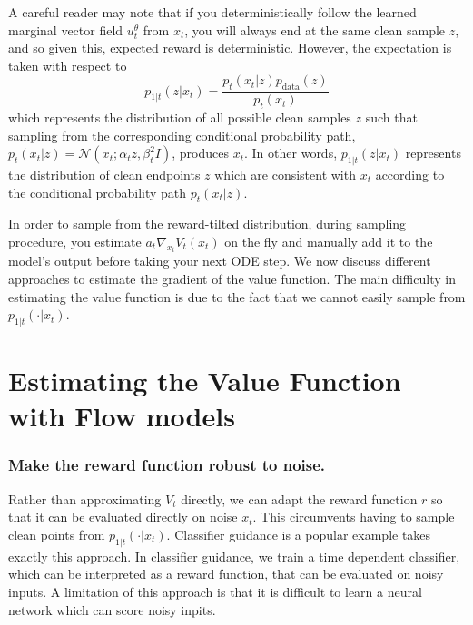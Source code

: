 \documentclass[12pt,a4paper]{report}
\begin{document}
A careful reader may note that if you deterministically follow the learned marginal vector field $u_t^\theta$ from $x_t$, you will always end at the same clean sample $z$, and so given this, expected reward is deterministic. However, the expectation is taken with respect to
$$
p_{1|t}(z|x_t) = \frac{p_t(x_t|z)p_{\text{data}}(z)}{p_t(x_t)}
$$
which represents the distribution of all possible clean samples $z$ such that sampling from the corresponding conditional probability path, $p_t(x_t|z)=\mathcal{N}(x_t; \alpha_t z, \beta_t^2 I)$, produces $x_t$. In other words, $p_{1|t}(z|x_t)$ represents the distribution of clean endpoints $z$ which are consistent with $x_t$ according to the conditional probability path $p_t(x_t|z)$. 

In order to sample from the reward-tilted distribution, during sampling procedure, you estimate $a_t \nabla_{x_t}V_t(x_t)$ on the fly and manually add it to the model's output before taking your next ODE step.
We now discuss different approaches to estimate the gradient of the value function. 
The main difficulty in estimating the value function is due to the fact that we cannot easily sample from $p_{1|t}(\cdot|x_t)$. 

\section{Estimating the Value Function with Flow models}

\subsubsection{Make the reward function robust to noise.} 
Rather than approximating $V_t$ directly, we can adapt the reward function $r$ so that it can be evaluated directly on noise $x_t$. This circumvents having to sample clean points from $p_{1|t}(\cdot|x_t)$. Classifier guidance is a popular example takes exactly this approach. In classifier guidance, we train a time dependent classifier, which can be interpreted as a reward function, that can be evaluated on noisy inputs. A limitation of this approach is that it is difficult to learn a neural network which can score noisy inpits. 
\end{document}
